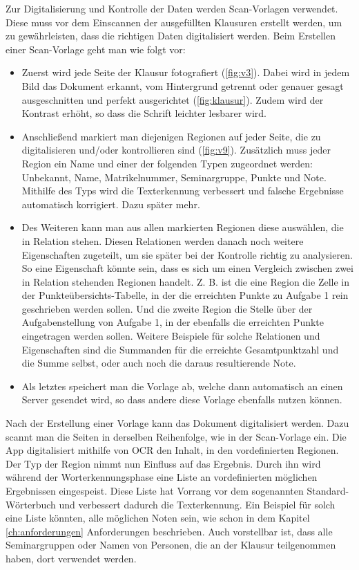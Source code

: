 \documentclass[nomenclature, oneside, 150]{HSMW-Thesis}
\begin{document}
	Zur Digitalisierung und Kontrolle der Daten werden Scan-Vorlagen verwendet. Diese muss vor dem Einscannen der ausgefüllten Klausuren erstellt werden, um zu gewährleisten, dass die richtigen Daten digitalisiert werden. Beim Erstellen einer Scan-Vorlage geht man wie folgt vor:
	\begin{itemize}
		\item Zuerst wird jede Seite der Klausur fotografiert (\ref{fig:v3}). Dabei wird in jedem Bild das Dokument erkannt, vom Hintergrund getrennt oder genauer gesagt ausgeschnitten und perfekt ausgerichtet (\ref{fig:klausur}). Zudem wird der Kontrast erhöht, so dass die Schrift leichter lesbarer wird.
		
		\item Anschließend markiert man diejenigen Regionen auf jeder Seite, die zu digitalisieren und/oder kontrollieren sind (\ref{fig:v9}). Zusätzlich muss jeder Region ein Name und einer der folgenden Typen zugeordnet werden: Unbekannt, Name, Matrikelnummer, Seminargruppe, Punkte und Note. Mithilfe des Typs wird die Texterkennung verbessert und falsche Ergebnisse automatisch korrigiert. Dazu später mehr.
			
		\item Des Weiteren kann man aus allen markierten Regionen diese auswählen, die in Relation stehen. Diesen Relationen werden danach noch weitere Eigenschaften zugeteilt, um sie später bei der Kontrolle richtig zu analysieren. So eine Eigenschaft könnte sein, dass es sich um einen Vergleich zwischen zwei in Relation stehenden Regionen handelt. Z. B. ist die eine Region die Zelle in der Punkteübersichts-Tabelle, in der die erreichten Punkte zu Aufgabe 1 rein geschrieben werden sollen. Und die zweite Region die Stelle über der Aufgabenstellung von Aufgabe 1, in der ebenfalls die erreichten Punkte eingetragen werden sollen. Weitere Beispiele für solche Relationen und Eigenschaften sind die Summanden für die erreichte Gesamtpunktzahl und die Summe selbst, oder auch noch die daraus resultierende Note.
		
		\item Als letztes speichert man die Vorlage ab, welche dann automatisch an einen Server gesendet wird, so dass andere diese Vorlage ebenfalls nutzen können.
	\end{itemize}
	
	Nach der Erstellung einer Vorlage kann das Dokument digitalisiert werden. Dazu scannt man die Seiten in derselben Reihenfolge, wie in der Scan-Vorlage ein. Die App digitalisiert mithilfe von OCR den Inhalt, in den vordefinierten Regionen. Der Typ der Region nimmt nun Einfluss auf das Ergebnis. Durch ihn wird während der Worterkennungsphase eine Liste an vordefinierten möglichen Ergebnissen eingespeist. Diese Liste hat Vorrang vor dem sogenannten Standard-Wörterbuch und verbessert dadurch die Texterkennung. Ein Beispiel für solch eine Liste könnten, alle möglichen Noten sein, wie schon in dem Kapitel \ref{ch:anforderungen} Anforderungen beschrieben. Auch vorstellbar ist, dass alle Seminargruppen oder Namen von Personen, die an der Klausur teilgenommen haben, dort verwendet werden. 
	
\end{document}
